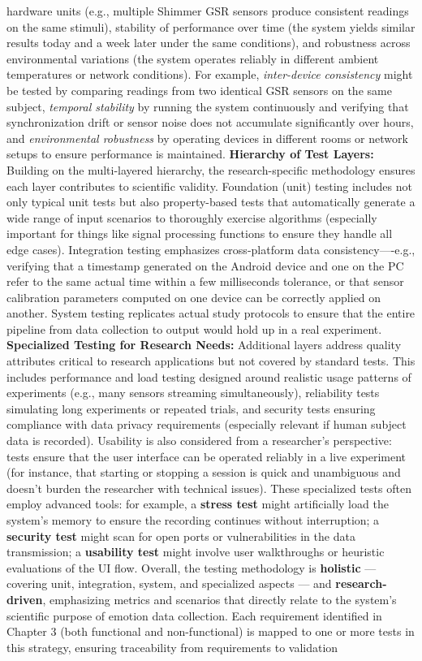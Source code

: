 hardware units (e.g., multiple Shimmer GSR sensors produce consistent readings on the same stimuli), stability of performance over time (the system yields similar results today and a week later under the same conditions), and robustness across environmental variations (the system operates reliably in different ambient temperatures or network conditions). For example, \textit{inter-device consistency} might be tested by comparing readings from two identical GSR sensors on the same subject, \textit{temporal stability} by running the system continuously and verifying that synchronization drift or sensor noise does not accumulate significantly over hours, and \textit{environmental robustness} by operating devices in different rooms or network setups to ensure performance is maintained. \textbf{Hierarchy of Test Layers:} Building on the multi-layered hierarchy, the research-specific methodology ensures each layer contributes to scientific validity. Foundation (unit) testing includes not only typical unit tests but also property-based tests that automatically generate a wide range of input scenarios to thoroughly exercise algorithms (especially important for things like signal processing functions to ensure they handle all edge cases). Integration testing emphasizes cross-platform data consistency----e.g., verifying that a timestamp generated on the Android device and one on the PC refer to the same actual time within a few milliseconds tolerance, or that sensor calibration parameters computed on one device can be correctly applied on another. System testing replicates actual study protocols to ensure that the entire pipeline from data collection to output would hold up in a real experiment. \textbf{Specialized Testing for Research Needs:} Additional layers address quality attributes critical to research applications but not covered by standard tests. This includes performance and load testing designed around realistic usage patterns of experiments (e.g., many sensors streaming simultaneously), reliability tests simulating long experiments or repeated trials, and security tests ensuring compliance with data privacy requirements (especially relevant if human subject data is recorded). Usability is also considered from a researcher's perspective: tests ensure that the user interface can be operated reliably in a live experiment (for instance, that starting or stopping a session is quick and unambiguous and doesn't burden the researcher with technical issues). These specialized tests often employ advanced tools: for example, a \textbf{stress test} might artificially load the system's memory to ensure the recording continues without interruption; a \textbf{security test} might scan for open ports or vulnerabilities in the data transmission; a \textbf{usability test} might involve user walkthroughs or heuristic evaluations of the UI flow. Overall, the testing methodology is \textbf{holistic} --- covering unit, integration, system, and specialized aspects --- and \textbf{research-driven}, emphasizing metrics and scenarios that directly relate to the system's scientific purpose of emotion data collection. Each requirement identified in Chapter 3 (both functional and non-functional) is mapped to one or more tests in this strategy, ensuring traceability from requirements to validation 